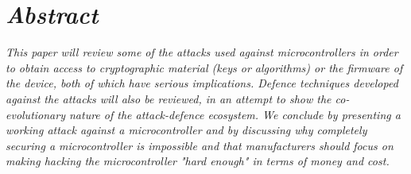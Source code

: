 \section*{\emph{Abstract}}
\emph{This paper will review some of the attacks used against microcontrollers in order to obtain access to cryptographic material (keys or algorithms) or the firmware of the device, both of which have serious implications. Defence techniques developed against the attacks will also be reviewed, in an attempt to show the co-evolutionary nature of the attack-defence ecosystem. We conclude by presenting a working attack against a microcontroller and by discussing why completely securing a microcontroller is impossible and that manufacturers should focus on making hacking the microcontroller "hard enough" in terms of money and cost.}